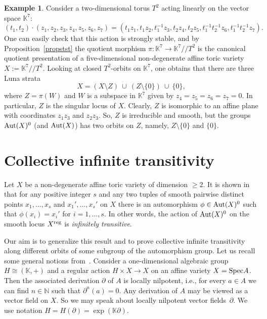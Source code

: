 \documentclass[12pt,a4paper]{amsart}
\theoremstyle{plain}
\theoremstyle{definition}
\newtheorem{example}{Example}
\begin{document}
\begin{example}
Consider a two-dimensional torus $T^2$ acting linearly on the vector space ${{\mathbb K}}^7$:
$$
(t_1,t_2)\cdot(z_1,z_2,z_3,z_4,z_5,z_6,z_7)=
(t_1z_1,t_1z_2,t_1^{-1}z_3,t_2z_4,t_2z_5,t_1^{-1}t_2^{-1}z_6,t_1^{-1}t_2^{-1}z_7).
$$
One can easily check that this action is strongly stable, and by Proposition~\ref{propstst}
the quotient morphism $\pi: {{\mathbb K}}^7 \to {{\mathbb K}}^7/\!/T^2$ is the canonical quotient
presentation of a five-dimensional non-degenerate affine toric variety $X:={{\mathbb K}}^7/\!/T^2$.
Looking at closed $T^2$-orbits on ${{\mathbb K}}^7$, one obtains that there are three
Luna strata
$$
X = (X \setminus Z) \ \cup \ (Z \setminus \{0\}) \ \cup \ \{0\},
$$
where $Z=\pi(W)$ and $W$ is a subspace in ${{\mathbb K}}^7$ given by $z_4=z_5=z_6=z_7=0$.
In particular, $Z$ is the singular locus of $X$. Clearly,
$Z$ is isomorphic to an affine plane with coordinates $z_1z_3$ and $z_2z_3$. So, $Z$
is irreducible and smooth, but the groups ${\mathop{\rm Aut}}(X)^0$ (and ${\mathop{\rm Aut}}(X)$) has two orbits
on $Z$, namely, $Z \setminus \{0\}$ and $\{0\}$.
\end{example}

\section{Collective infinite transitivity}
\label{sec7}

Let $X$ be a non-degenerate affine toric variety of dimension $\ge 2$.
It is shown in \cite[Theorem~2.1]{AKZ} that for any positive integer $s$
and any two tuples of smooth pairwise distinct points $x_1,\ldots,x_s$
and $x_1',\ldots,x_s'$ on $X$ there is an automorphism $\phi\in{\mathop{\rm Aut}}(X)^0$
such that $\phi(x_i)=x_i'$ for $i=1,\ldots,s$. In other words, the
action of ${\mathop{\rm Aut}}(X)^0$ on the smooth locus $X^{\mathop{\rm reg}}$ is {\it infinitely
transitive}.

Our aim is to generalize this result and to prove collective infinite transitivity
along different orbits of some subgroup of the automorphism group.
Let us recall some general notions from~\cite{AFKKZ}.
Consider a one-dimensional algebraic group $H\cong({{\mathbb K}},+)$ and a regular action
$H\times X \to X$ on an affine variety $X={\mathop{\rm Spec}} A$. Then the associated derivation
$\partial$ of $A$ is locally nilpotent, i.e., for every $a\in A$ we can find
$n\in{{\mathbb N}}$ such that $\partial^n(a)=0$. Any derivation of $A$ may be viewed as
a vector field on $X$. So we may speak about locally nilpotent vector fields~$\partial$.
We use notation $H=H(\partial)=\exp({{\mathbb K}}\partial)$.
\end{document}
